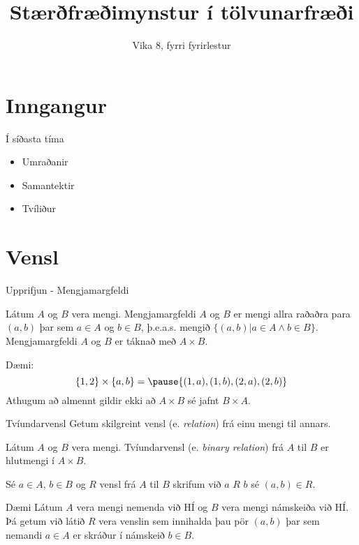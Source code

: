 \documentclass[handout]{beamer}
\title{Stærðfræðimynstur í tölvunarfræði}
\subtitle{Vika 8, fyrri fyrirlestur}
\begin{document}
\begin{frame}
\titlepage
\end{frame}


\section{Inngangur}

\begin{frame}{Í síðasta tíma}
    \begin{itemize}
        \item Umraðanir
        \item Samantektir
        \item Tvíliður
    \end{itemize}
\end{frame}

\section{Vensl}

\begin{frame}{Upprifjun - Mengjamargfeldi}
\begin{tcolorbox}[title=Mengjamargfeldi]
Látum $A$ og $B$ vera mengi. Mengjamargfeldi $A$ og $B$ er mengi allra raðaðra para $(a, b)$ þar sem $a \in A$ og $b \in B$, þ.e.a.s. mengið $\{(a, b) | a \in A \land b \in B\}$. Mengjamargfeldi $A$ og $B$ er táknað með $A \times B$.
\end{tcolorbox}
Dæmi:
\[
 \{1, 2\} \times \{a, b\} = \pause \{(1, a), (1, b), (2, a), (2, b)\}
\]
Athugum að almennt gildir ekki að $A \times B$ sé jafnt $B \times A$.
\end{frame}

\begin{frame}{Tvíundarvensl}
Getum skilgreint vensl (e. \emph{relation}) frá einu mengi til annars.

\begin{tcolorbox}[title=Tvíundarvensl]
Látum $A$ og $B$ vera mengi. Tvíundarvensl (e. \emph{binary relation}) frá $A$ til $B$ er hlutmengi í $A \times B$.
\end{tcolorbox}
Sé $a \in A$, $b \in B$ og $R$ vensl frá $A$ til $B$ skrifum við $a$ $R$ $b$ sé $(a,b) \in R$.
\end{frame}

\begin{frame}{Dæmi}
Látum $A$ vera mengi nemenda við HÍ og $B$ vera mengi námskeiða við HÍ. Þá getum við látið $R$ vera venslin sem innihalda þau pör $(a,b)$ þar sem nemandi $a \in A$ er skráður í námskeið $b \in B$.
\end{frame}
\end{document}

